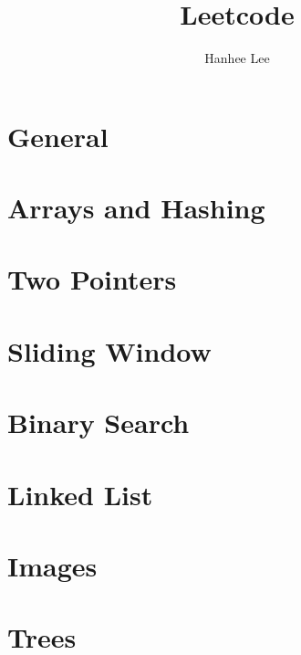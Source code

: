 \documentclass{article}
\title{Leetcode}
\author{Hanhee Lee}
\begin{document}
\section{General}

\newpage

\section{Arrays and Hashing}

\newpage


\section{Two Pointers}

\newpage

\section{Sliding Window}

\newpage

\section{Binary Search}

\newpage

\section{Linked List}

\newpage

\section{Images}

\newpage

\section{Trees}

\newpage
\end{document}
